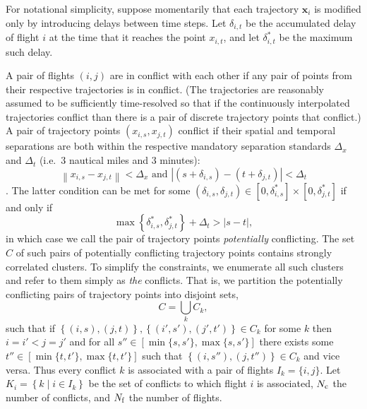 For notational simplicity, suppose momentarily that each trajectory $\mathbf x_i$ is modified only by introducing delays between time steps.
Let $\delta_{i, t}$ be the accumulated delay of flight $i$ at the time that it reaches the point $x_{i, t}$, and let $\delta^*_{i, t}$ be the maximum such delay.

A pair of flights $(i, j)$ are in conflict with each other if any pair of points from their respective trajectories is in conflict.
(The trajectories are reasonably assumed to be sufficiently time-resolved so that if the continuously interpolated trajectories conflict than there is a pair of discrete trajectory points that conflict.)
A pair of trajectory points $(x_{i,s}, x_{j,t})$ conflict if their spatial and temporal separations are both within the respective mandatory separation standards $\Delta_x$ and $\Delta_t$ (i.e.\ $3$ nautical miles and $3$ minutes):
\begin{equation}
\left\|x_{i, s} - x_{j,t}\right\| < \Delta_x \text{ and } 
\left|\left(s + \delta_{i, s}\right) - \left(t + \delta_{j,t}\right)\right|
< \Delta_t
\end{equation}.
The latter condition can be met for some 
$\left(\delta_{i,s}, \delta_{j,t} \right) \in [0, \delta^*_{i,s}] \times [0, \delta^*_{j,t}]$ if and only if 
\begin{equation}
\max \left\{\delta^*_{i, s}, \delta^*_{j, t}\right\} + \Delta_t > |s - t|,
\end{equation}
in which case we call the pair of trajectory points \emph{potentially} conflicting.
The set $C$ of such pairs of potentially conflicting trajectory points contains strongly correlated clusters.
To simplify the constraints, we enumerate all such clusters and refer to them simply as \emph{the} conflicts.
That is, we partition the potentially conflicting pairs of trajectory points into disjoint sets,
\begin{equation}
C =  \bigcup_{k} C_k,
\end{equation}
such that if $\left\{(i, s), (j, t)\right\}, \left\{(i', s'), (j', t')\right\} \in C_k$ for some $k$ then
$i = i' < j = j'$ and for all 
$s'' \in [\min \{s, s'\}, \max\{s, s'\}]$
there exists some 
${t'' \in [\min \{t, t'\}, \max\{t, t'\}]}$
such that
${\left\{(i, s''), (j, t'')\right\} \in C_k}$ and vice versa.
Thus every conflict $k$ is associated with a pair of flights $I_k = \{i, j\}$.
Let $K_i = \left\{k \middle| i \in I_k \right\}$ be the set of conflicts to which flight $i$ is associated, $N_{\mathrm{c}}$ the number of conflicts, and $N_{\mathrm{f}}$ the number of flights.

